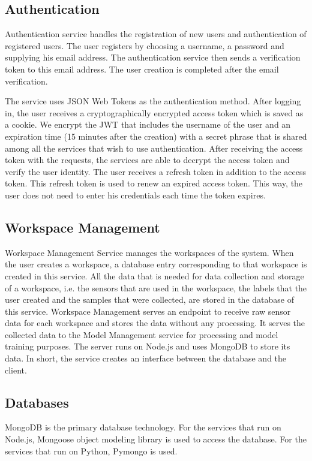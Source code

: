 \subsection{Authentication}
Authentication service handles the registration of new users and authentication of registered users. The user registers by choosing a username, a password and supplying his email address. The authentication service then sends a verification token to this email address. The user creation is completed after the email verification.
\par The service uses JSON Web Tokens as the authentication method. After logging in, the user receives a cryptographically encrypted access token which is saved as a cookie. We encrypt the JWT that includes the username of the user and an expiration time (15 minutes after the creation) with a secret phrase that is shared among all the services that wish to use authentication. After receiving the access token with the requests, the services are able to decrypt the access token and verify the user identity. The user receives a refresh token in addition to the access token. This refresh token is used to renew an expired access token. This way, the user does not need to enter his credentials each time the token expires.

\subsection{Workspace Management}
Workspace Management Service manages the workspaces of the system. When the user creates a workspace, a database entry corresponding to that workspace is created in this service. All the data that is needed for data collection and storage of a workspace, i.e. the sensors that are used in the workspace, the labels that the user created and the samples that were collected, are stored in the database of this service. Workspace Management serves an endpoint to receive raw sensor data for each workspace and stores the data without any processing. It serves the collected data to the Model Management service for processing and model training purposes. The server runs on Node.js and uses MongoDB to store its data. In short, the service creates an interface between the database and the client.

\subsection{Databases}
MongoDB is the primary database technology. For the services that run on Node.js, Mongoose object modeling library is used to access the database. For the services that run on Python, Pymongo is used.